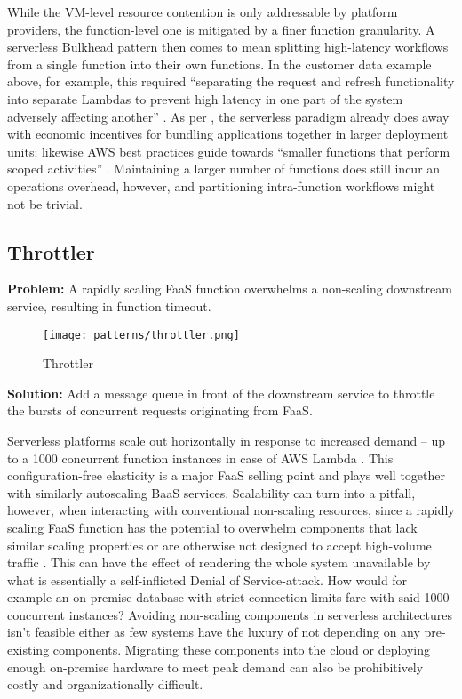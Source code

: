 While the VM-level resource contention is only addressable by platform providers, the function-level one is mitigated by a finer function granularity. A serverless Bulkhead pattern then comes to mean splitting high-latency workflows from a single function into their own functions. In the customer data example above, for example, this required ``separating the request and refresh functionality into separate Lambdas to prevent high latency in one part of the system adversely affecting another'' \parencite{bardsley18optimizationStrategies}. As per \textcite{adzic2017serverless}, the serverless paradigm already does away with economic incentives for bundling applications together in larger deployment units; likewise AWS best practices guide towards ``smaller functions that perform scoped activities'' \parencite{aws18serverlessLens}. Maintaining a larger number of functions does still incur an operations overhead, however, and partitioning intra-function workflows might not be trivial.

\subsection{Throttler} \label{subsec:throttler}

\textbf{Problem:} A rapidly scaling FaaS function overwhelms a non-scaling downstream service, resulting in function timeout.

\begin{figure}[h]
  \centering
  \texttt{[image: patterns/throttler.png]}
  \caption{Throttler}
  \label{fig:throttler}
\end{figure}

\textbf{Solution:} Add a message queue in front of the downstream service to throttle the bursts of concurrent requests originating from FaaS.

Serverless platforms scale out horizontally in response to increased demand -- up to a 1000 concurrent function instances in case of AWS Lambda \parencite{awslambda0218}. This configuration-free elasticity is a major FaaS selling point and plays well together with similarly autoscaling BaaS services. Scalability can turn into a pitfall, however, when interacting with conventional non-scaling resources, since a rapidly scaling FaaS function has the potential to overwhelm components that lack similar scaling properties or are otherwise not designed to accept high-volume traffic \parencite{cncf18serverlessWG}. This can have the effect of rendering the whole system unavailable by what is essentially a self-inflicted Denial of Service-attack. How would for example an on-premise database with strict connection limits fare with said 1000 concurrent instances? Avoiding non-scaling components in serverless architectures isn't feasible either as few systems have the luxury of not depending on any pre-existing components. Migrating these components into the cloud or deploying enough on-premise hardware to meet peak demand can also be prohibitively costly and organizationally difficult.

